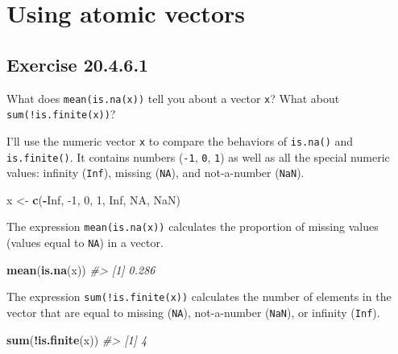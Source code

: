 \documentclass[]{book}
\newenvironment{Shaded}{\begin{snugshade}}{\end{snugshade}}
\newcommand{\CommentTok}[1]{\textcolor[rgb]{0.56,0.35,0.01}{\textit{#1}}}
\newcommand{\DecValTok}[1]{\textcolor[rgb]{0.00,0.00,0.81}{#1}}
\newcommand{\KeywordTok}[1]{\textcolor[rgb]{0.13,0.29,0.53}{\textbf{#1}}}
\newcommand{\NormalTok}[1]{#1}
\newcommand{\OperatorTok}[1]{\textcolor[rgb]{0.81,0.36,0.00}{\textbf{#1}}}
\newcommand{\OtherTok}[1]{\textcolor[rgb]{0.56,0.35,0.01}{#1}}
\newcommand{\StringTok}[1]{\textcolor[rgb]{0.31,0.60,0.02}{#1}}
\theoremstyle{plain}
\theoremstyle{remark}
\begin{document}
\hypertarget{using-atomic-vectors}{%
\section{Using atomic vectors}\label{using-atomic-vectors}}

\hypertarget{exercise-20.4.6.1}{%
\subsection*{\texorpdfstring{Exercise
{20.4.6.1}}{Exercise 20.4.6.1}}\label{exercise-20.4.6.1}}

What does \texttt{mean(is.na(x))} tell you about a vector \texttt{x}?
What about \texttt{sum(!is.finite(x))}?

I'll use the numeric vector \texttt{x} to compare the behaviors of
\texttt{is.na()} and \texttt{is.finite()}. It contains numbers
(\texttt{-1}, \texttt{0}, \texttt{1}) as well as all the special numeric
values: infinity (\texttt{Inf}), missing (\texttt{NA}), and not-a-number
(\texttt{NaN}).

\begin{Shaded}
\begin{Highlighting}[]
\NormalTok{x <-}\StringTok{ }\KeywordTok{c}\NormalTok{(}\OperatorTok{-}\OtherTok{Inf}\NormalTok{, }\DecValTok{-1}\NormalTok{, }\DecValTok{0}\NormalTok{, }\DecValTok{1}\NormalTok{, }\OtherTok{Inf}\NormalTok{, }\OtherTok{NA}\NormalTok{, }\OtherTok{NaN}\NormalTok{)}
\end{Highlighting}
\end{Shaded}

The expression \texttt{mean(is.na(x))} calculates the proportion of
missing values (values equal to \texttt{NA}) in a vector.

\begin{Shaded}
\begin{Highlighting}[]
\KeywordTok{mean}\NormalTok{(}\KeywordTok{is.na}\NormalTok{(x))}
\CommentTok{#> [1] 0.286}
\end{Highlighting}
\end{Shaded}

The expression \texttt{sum(!is.finite(x))} calculates the number of
elements in the vector that are equal to missing (\texttt{NA}),
not-a-number (\texttt{NaN}), or infinity (\texttt{Inf}).

\begin{Shaded}
\begin{Highlighting}[]
\KeywordTok{sum}\NormalTok{(}\OperatorTok{!}\KeywordTok{is.finite}\NormalTok{(x))}
\CommentTok{#> [1] 4}
\end{Highlighting}
\end{Shaded}
\end{document}
